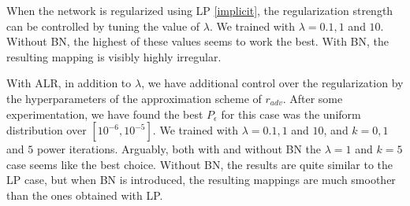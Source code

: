 \documentclass{article}
\begin{document}
When the network is regularized using LP \eqref{implicit}, the regularization strength can be controlled by tuning the value of $\lambda$. We trained with $\lambda = 0.1, 1$ and $10$. Without BN, the highest of these values seems to work the best. With BN, the resulting mapping is visibly highly irregular.

With ALR, in addition to $\lambda$, we have additional control over the regularization by the hyperparameters of the approximation scheme of $r_{adv}$. After some experimentation, we have found the best $P_\epsilon$ for this case was the uniform distribution over $[10^{-6}, 10^{-5}]$. We trained with $\lambda = 0.1, 1$ and $10$, and $k = 0, 1$ and $5$ power iterations. Arguably, both with and without BN the $\lambda = 1$ and $k=5$ case seems like the best choice. Without BN, the results are quite similar to the LP case, but when BN is introduced, the resulting mappings are much smoother than the ones obtained with LP.

\newpage
\end{document}
